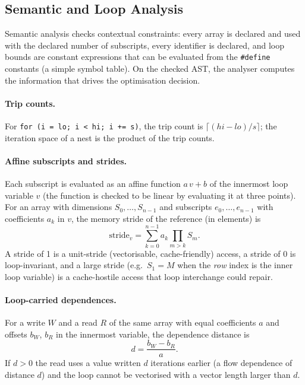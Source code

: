 \subsection{Semantic and Loop Analysis}

Semantic analysis checks contextual constraints: every array is declared and used
with the declared number of subscripts, every identifier is declared, and loop
bounds are constant expressions that can be evaluated from the \texttt{\#define}
constants (a simple symbol table). On the checked AST, the analyser computes the
information that drives the optimisation decision.

\paragraph{Trip counts.} For \texttt{for (i = lo; i < hi; i += s)}, the trip count is
$\lceil (hi-lo)/s\rceil$; the iteration space of a nest is the product of the trip counts.

\paragraph{Affine subscripts and strides.} Each subscript is evaluated as an
affine function $a\,v+b$ of the innermost loop variable $v$ (the function is
checked to be linear by evaluating it at three points). For an array with
dimensions $S_0,\dots,S_{n-1}$ and subscripts $e_0,\dots,e_{n-1}$ with
coefficients $a_k$ in $v$, the memory stride of the reference (in elements) is
\begin{equation}
\mathrm{stride}_v = \sum_{k=0}^{n-1} a_k \prod_{m>k} S_m .
\end{equation}
A stride of 1 is a unit-stride (vectorisable, cache-friendly) access, a stride of 0 is
loop-invariant, and a large stride (e.g.\ $S_1=M$ when the \emph{row} index is the inner loop
variable) is a cache-hostile access that loop interchange could repair.

\paragraph{Loop-carried dependences.} For a write $W$ and a read $R$ of the same
array with equal coefficients $a$ and offsets $b_W$, $b_R$ in the innermost
variable, the dependence distance is
\begin{equation}
d = \frac{b_W - b_R}{a}.
\end{equation}
If $d>0$ the read uses a value written $d$ iterations earlier (a flow dependence of
distance $d$) and the loop cannot be vectorised with a vector length larger than $d$.

